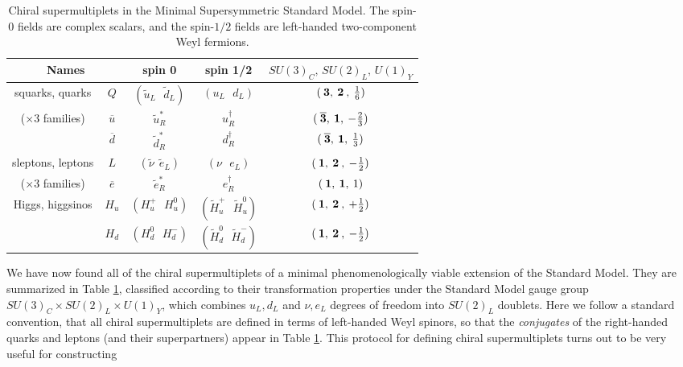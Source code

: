 \documentclass[11pt]{article}
\def\sbar{\overline}
\def\stilde{\widetilde}
\begin{document}
\renewcommand{\arraystretch}{1.4}
\begin{table}[tb]
\begin{center}
\begin{tabular}{|c|c|c|c|c|}
\hline
\multicolumn{2}{|c|}{Names} 
& spin 0 & spin 1/2 & $SU(3)_C ,\, SU(2)_L ,\, U(1)_Y$
\\  \hline\hline
squarks, quarks & $Q$ & $({\stilde u}_L\>\>\>{\stilde d}_L )$&
 $(u_L\>\>\>d_L)$ & $(\>{\bf 3},\>{\bf 2}\>,\>{1\over 6})$
\\
($\times 3$ families) & $\sbar u$
&${\stilde u}^*_R$ & $u^\dagger_R$ & 
$(\>{\bf \overline 3},\> {\bf 1},\> -{2\over 3})$
\\ & $\sbar d$ &${\stilde d}^*_R$ & $d^\dagger_R$ & 
$(\>{\bf \overline 3},\> {\bf 1},\> {1\over 3})$
\\  \hline
sleptons, leptons & $L$ &$({\stilde \nu}\>\>{\stilde e}_L )$&
 $(\nu\>\>\>e_L)$ & $(\>{\bf 1},\>{\bf 2}\>,\>-{1\over 2})$
\\
($\times 3$ families) & $\sbar e$
&${\stilde e}^*_R$ & $e^\dagger_R$ & $(\>{\bf 1},\> {\bf 1},\>1)$
\\  \hline
Higgs, higgsinos &$H_u$ &$(H_u^+\>\>\>H_u^0 )$&
$(\stilde H_u^+ \>\>\> \stilde H_u^0)$& 
$(\>{\bf 1},\>{\bf 2}\>,\>+{1\over 2})$
\\ &$H_d$ & $(H_d^0 \>\>\> H_d^-)$ & $(\stilde H_d^0 \>\>\> \stilde H_d^-)$& 
$(\>{\bf 1},\>{\bf 2}\>,\>-{1\over 2})$
\\  \hline
\end{tabular}
\caption{Chiral supermultiplets in the Minimal Supersymmetric Standard Model.
The spin-$0$ fields are complex scalars, and the spin-$1/2$ fields are 
left-handed two-component Weyl fermions.\label{tab:chiral}}
\vspace{-0.6cm}
\end{center}
\end{table}
We have now found all of the chiral supermultiplets of a minimal
phenomenologically viable extension of the Standard Model. They are
summarized in Table \ref{tab:chiral}, 
classified according to their transformation
properties under the Standard Model gauge group $SU(3)_C\times SU(2)_L
\times U(1)_Y$, which combines $u_L,d_L$ and $\nu,e_L$ degrees of freedom
into $SU(2)_L$ doublets. Here we follow a standard convention, that all
chiral supermultiplets are defined in terms of left-handed Weyl spinors,
so that the {\it conjugates} of the right-handed quarks and leptons (and
their superpartners) appear in Table \ref{tab:chiral}. 
This protocol for defining chiral
supermultiplets turns out to be very useful for constructing
\end{document}
